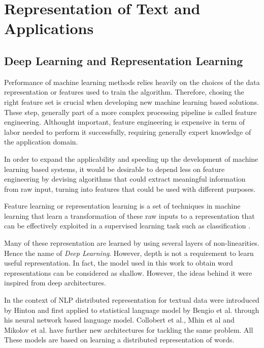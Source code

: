 
\chapter{Representation of Text and Applications}
\label{chap:related_work}

\section{Deep Learning and Representation Learning}
 \label{sec:deep_learning}
Performance of machine learning methods relies heavily on the choices of the
data representation or features used to train the algorithm. Therefore,
chosing the right feature set is crucial when developing new machine learning
based solutions. These step, generally part of a more complex processing
pipeline is called feature engineering.
Althought important, feature engineering is expensive in term of labor needed
to perform it successfully, requiring  generally  expert knowledge of the application
domain.  

In order to expand the applicability and speeding up the
development of machine learning based systems, it would be desirable to
depend less on feature engineering by devising algorithms  that could extract
meaningful  information from raw input, turning into features that could be
used with different purposes.

Feature learning or representation learning is a set of techniques in machine
learning that learn a transformation of these raw inputs to a representation that
can be effectively exploited in a supervised learning task such as
classification \cite{DBLP:journals/corr/abs-1206-5538}. 

Many of these representation  are learned by using several layers of
non-linearities. Hence the name of \textit{Deep Learning}. However, depth is
not a requirement to learn useful representation. In fact, the model used in
this work to obtain word representations  can be considered as shallow.
However, the ideas behind it were inspired from deep architectures.


In the context of \ac{NLP} distributed representation for textual data were
introduced by Hinton \cite{hinton:learndistrep} and first applied to
statistical language model by Bengio et al. \cite{Bengio:2008} through his
neural network based language model. Collobert  et al.\cite{collobert:2008}, Mhin et
al \cite{Mnih08ascalable} and
Mikolov et al.  \cite{conf/interspeech/MikolovKBCK10,conf/icassp/MikolovKBGC09} have further
new  architectures for tackling the same problem. All These models are based on learning a distributed
representation of words.



